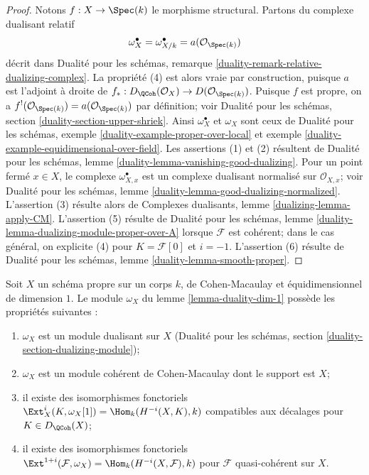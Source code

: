 \begin{proof}
Notons $f : X \to \Spec(k)$ le morphisme structural. Partons du complexe dualisant relatif $$
\omega_X^\bullet = \omega_{X/k}^\bullet = a(\mathcal{O}_{\Spec(k)})
$$ décrit dans Dualité pour les schémas, remarque \ref{duality-remark-relative-dualizing-complex}. La propriété (4) est alors vraie par construction, puisque $a$ est l'adjoint à droite de $f_* : D_\QCoh(\mathcal{O}_X) \to D(\mathcal{O}_{\Spec(k)})$. Puisque $f$ est propre, on a $f^!(\mathcal{O}_{\Spec(k)}) = a(\mathcal{O}_{\Spec(k)})$ par définition; voir Dualité pour les schémas, section \ref{duality-section-upper-shriek}. Ainsi $\omega_X^\bullet$ et $\omega_X$ sont ceux de Dualité pour les schémas, exemple \ref{duality-example-proper-over-local} et exemple \ref{duality-example-equidimensional-over-field}. Les assertions (1) et (2) résultent de Dualité pour les schémas, lemme \ref{duality-lemma-vanishing-good-dualizing}. Pour un point fermé $x \in X$, le complexe $\omega_{X, x}^\bullet$ est un complexe dualisant normalisé sur $\mathcal{O}_{X, x}$; voir Dualité pour les schémas, lemme \ref{duality-lemma-good-dualizing-normalized}. L'assertion (3) résulte alors de Complexes dualisants, lemme \ref{dualizing-lemma-apply-CM}. L'assertion (5) résulte de Dualité pour les schémas, lemme \ref{duality-lemma-dualizing-module-proper-over-A} lorsque $\mathcal{F}$ est cohérent; dans le cas général, on explicite (4) pour $K = \mathcal{F}[0]$ et $i = -1$. L'assertion (6) résulte de Dualité pour les schémas, lemme \ref{duality-lemma-smooth-proper}.
\end{proof}

\begin{lemma}
\label{lemma-duality-dim-1-CM}
Soit $X$ un schéma propre sur un corps $k$, de Cohen-Macaulay et équidimensionnel de dimension $1$. Le module $\omega_X$ du lemme \ref{lemma-duality-dim-1} possède les propriétés suivantes : \begin{enumerate} \item $\omega_X$ est un module dualisant sur $X$ (Dualité pour les schémas, section \ref{duality-section-dualizing-module}); \item $\omega_X$ est un module cohérent de Cohen-Macaulay dont le support est $X$; \item il existe des isomorphismes fonctoriels $\Ext^i_X(K, \omega_X[1]) = \Hom_k(H^{-i}(X, K), k)$ compatibles aux décalages pour $K \in D_\QCoh(X)$; \item il existe des isomorphismes fonctoriels $\Ext^{1 + i}(\mathcal{F}, \omega_X) = \Hom_k(H^{-i}(X, \mathcal{F}), k)$ pour $\mathcal{F}$ quasi-cohérent sur $X$.
\end{enumerate}
\end{lemma}

